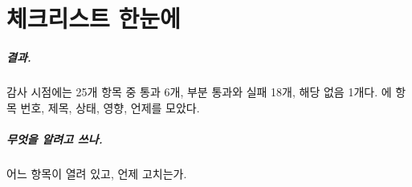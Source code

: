 \chapter{체크리스트 한눈에}\label{ch:checklist}

\paragraph{결과.}
감사 시점에는 25개 항목 중 \ckdone{} 통과 6개, \ckopen{} 부분 통과와 실패 18개, \ckna{} 해당 없음 1개다.
에 항목 번호, 제목, 상태, 영향, 언제를 모았다.

\paragraph{무엇을 알려고 쓰나.}
어느 항목이 열려 있고, 언제 고치는가.

